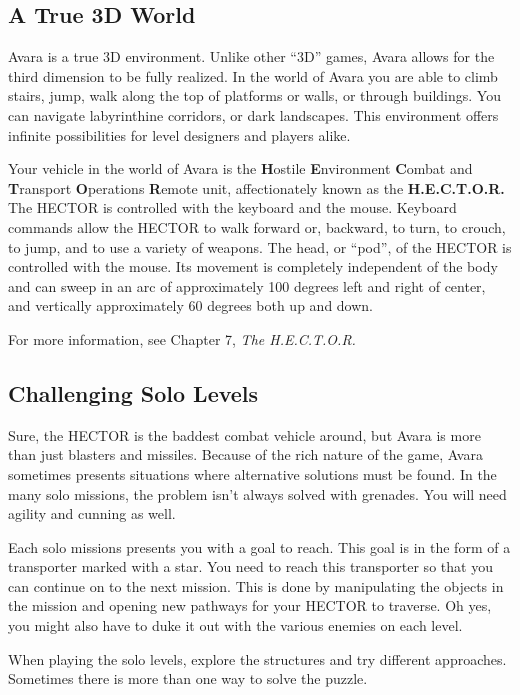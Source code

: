 \documentclass{article}
\begin{document}
\subsection{A True 3D World}
Avara is a true 3D environment. Unlike other ``3D'' games, Avara allows for the third dimension to be fully realized. In the world of Avara you are able to climb stairs, jump, walk along the top of platforms or walls, or through buildings. You can navigate labyrinthine corridors, or dark landscapes. This environment offers infinite possibilities for level designers and players alike.

Your vehicle in the world of Avara is the \textbf{H}ostile \textbf{E}nvironment \textbf{C}ombat and \textbf{T}ransport \textbf{O}perations \textbf{R}emote unit, affectionately known as the \textbf{H.E.C.T.O.R.} The HECTOR is controlled with the keyboard and the mouse. Keyboard commands allow the HECTOR to walk forward or, backward, to turn, to crouch, to jump, and to use a variety of weapons. The head, or ``pod'', of the HECTOR is controlled with the mouse. Its movement is completely independent of the body and can sweep in an arc of approximately 100 degrees left and right of center, and vertically approximately 60 degrees both up and down.

For more information, see Chapter 7, \textit{The H.E.C.T.O.R.}

\subsection{Challenging Solo Levels}
Sure, the HECTOR is the baddest combat vehicle around, but Avara is more than just blasters and missiles. Because of the rich nature of the game, Avara sometimes presents situations where alternative solutions must be found. In the many solo missions, the problem isn't always solved with grenades. You will need agility and cunning as well.

Each solo missions presents you with a goal to reach. This goal is in the form of a transporter marked with a star. You need to reach this transporter so that you can continue on to the next mission. This is done by manipulating the objects in the mission and opening new pathways for your HECTOR to traverse. Oh yes, you might also have to duke it out with the various enemies on each level.

When playing the solo levels, explore the structures and try different approaches. Sometimes there is more than one way to solve the puzzle.
\end{document}
